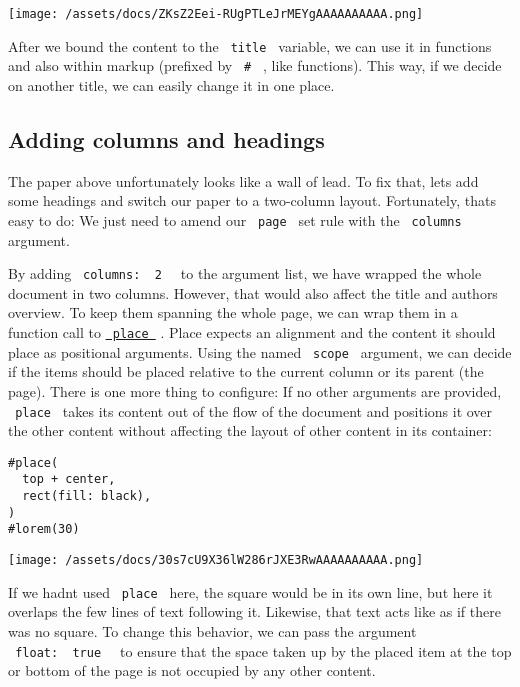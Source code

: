 \texttt{[image: /assets/docs/ZKsZ2Eei-RUgPTLeJrMEYgAAAAAAAAAA.png]}

After we bound the content to the \texttt{\ title\ } variable, we can
use it in functions and also within markup (prefixed by \texttt{\ \#\ }
, like functions). This way, if we decide on another title, we can
easily change it in one place.

\subsection{Adding columns and headings}\label{columns-and-headings}

The paper above unfortunately looks like a wall of lead. To fix that,
let\textquotesingle s add some headings and switch our paper to a
two-column layout. Fortunately, that\textquotesingle s easy to do: We
just need to amend our \texttt{\ page\ } set rule with the
\texttt{\ columns\ } argument.

By adding \texttt{\ columns:\ }{\texttt{\ 2\ }}\texttt{\ } to the
argument list, we have wrapped the whole document in two columns.
However, that would also affect the title and authors overview. To keep
them spanning the whole page, we can wrap them in a function call to
\href{/docs/reference/layout/place/}{\texttt{\ place\ }} . Place expects
an alignment and the content it should place as positional arguments.
Using the named \texttt{\ scope\ } argument, we can decide if the items
should be placed relative to the current column or its parent (the
page). There is one more thing to configure: If no other arguments are
provided, \texttt{\ place\ } takes its content out of the flow of the
document and positions it over the other content without affecting the
layout of other content in its container:

\begin{verbatim}
#place(
  top + center,
  rect(fill: black),
)
#lorem(30)
\end{verbatim}

\texttt{[image: /assets/docs/30s7cU9X36lW286rJXE3RwAAAAAAAAAA.png]}

If we hadn\textquotesingle t used \texttt{\ place\ } here, the square
would be in its own line, but here it overlaps the few lines of text
following it. Likewise, that text acts like as if there was no square.
To change this behavior, we can pass the argument
\texttt{\ float:\ }{\texttt{\ true\ }}\texttt{\ } to ensure that the
space taken up by the placed item at the top or bottom of the page is
not occupied by any other content.

